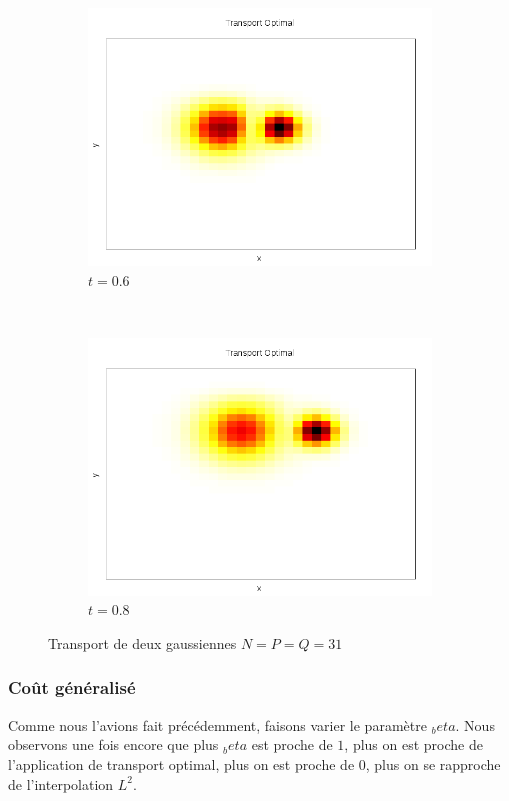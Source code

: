 \documentclass[a4paper,12pt]{article}
\begin{document}
\begin{figure}[!h]
\begin{subfigure}[b]{0.22\linewidth}
	\includegraphics[width=\textwidth]{img/2DMixture/C_00021.png}
	\caption{$t=0.6$}
	\end{subfigure}
	~
	\begin{subfigure}[b]{0.22\linewidth}
	\includegraphics[width=\textwidth]{img/2DMixture/C_00028.png}
	\caption{$t=0.8$}
	\end{subfigure}
	\caption{Transport de deux gaussiennes $N=P=Q=31$}
\end{figure}





\newpage


\subsubsection{Coût généralisé}
Comme nous l'avions fait précédemment, faisons varier le paramètre $_beta$. Nous observons une fois encore que plus $_beta$ est proche de $1$, plus on est proche de l'application de transport optimal, plus on est proche de $0$, plus on se rapproche de l'interpolation $L^2$. \\
\end{document}
